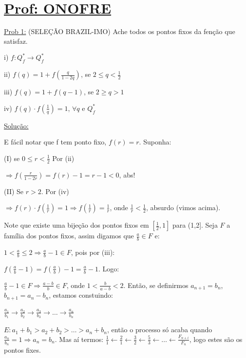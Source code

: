 \documentclass[a4paper,12pt]{article}
\renewcommand{\leq}{\ensuremath{\leqslant}}
\renewcommand{\geq}{\ensuremath{\geqslant}}
\theoremstyle{plain} %
\theoremstyle{definition} %
\theoremstyle{remark} %
\begin{document}
	\normalsize
	
	\newpage 
	\section*{\underline{Prof: ONOFRE}}
	
	\vspace{1ex}\underline{Prob 1:} (SELE\c{C}\~AO BRAZIL-IMO) Ache todos os pontos fixos da fen\c{c}\~ao que satisfaz. 
	
	i) $f: Q_f^{\ast}\rightarrow Q_f^{\ast}$
	
	ii) $f(q)=1+f\left(\displaystyle\frac{q}{1-2q}\right)$, se $2\leq q< \displaystyle\frac{1}{2}$
	
	iii) $f(q)=1+f(q-1)$, se $2\geq q> 1$
	
	iv) $f(q)\cdot f\left(\displaystyle\frac{1}{q}\right)=1$, $\forall q$ e $Q_f^{\ast}$
	
	\begin{framed}
		\underline{Solu\c{c}\~ao:}
		
		E f\'acil notar que f tem ponto fixo, $f(r)=r$. Suponha:
		
		(I) se $0\leq r<\displaystyle\frac{1}{2}$ Por (ii)
		
		$\Rightarrow f\left(\displaystyle\frac{r}{1-2r}\right)=f(r)-1=r-1<0$, abs!
		
		(II) Se $r>2$. Por (iv)
		
		$\Rightarrow f(r)\cdot f\left(\frac{1}{r}\right)=1\Rightarrow f\left(\frac{1}{r}\right)=\frac{1}{r}$, onde $\frac{1}{r}<\frac{1}{2}$, absurdo (vimos acima).
		
		Note que existe uma bije\c{c}\~ao dos pontos fixos em $[\frac{1}{2},1]$ para (1,2]. Seja $F$ a fam\'ilia dos pontos fixos, assim digamos que $\frac{a}{b}\in F$ e:
		
		$1<\frac{a}{b}\leq 2\Rightarrow \frac{a}{b}-1\in F$, pois por (iii):
		
		$f\left(\frac{a}{b}-1\right)=f\left(\frac{a}{b}\right)-1=\frac{a}{b}-1$. Logo:
		
		$\frac{a}{b}-1\in F\Rightarrow \frac{a-b}{b}\in F$, onde $1<\frac{b}{a-b}<2$. Ent\~ao, se definirmos $a_{n+1}=b_n$, $b_{n+1}=a_n-b_n$, estamos constuindo:
		
		\begin{center}
			$\frac{a_1}{b_1}\rightarrow\frac{a_2}{b_2}\rightarrow\frac{a_3}{b_3}\rightarrow\dots\rightarrow\frac{a_n}{b_n}$
		\end{center}
		
		$E: a_1+b_1>a_2+b_2>\dotso >a_n+b_n$, ent\~ao o processo s\'o acaba quando $\frac{a_n}{b_n}=1\Rightarrow a_n=b_n$. Mas a\'i termos: $\frac{1}{1}\leftarrow\frac{2}{1}\leftarrow\frac{3}{2}\leftarrow\frac{5}{3}\leftarrow\dotso\leftarrow\frac{F_{n+i}}{F_n}$, logo estes s\~ao os pontos fixes. \tiny\textblock
	\end{framed}
	
\end{document}
